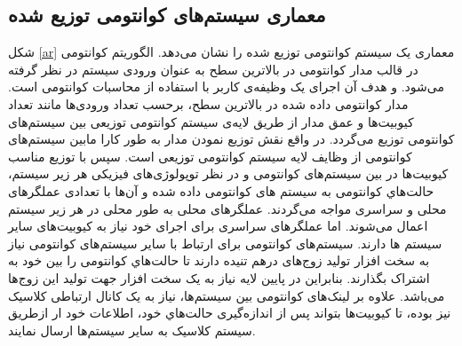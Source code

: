 \subsection{معماری سیستم‌های کوانتومی توزیع شده}
شکل \ref{ar} معماری یک سیستم کوانتومی توزیع شده را نشان می‌دهد. الگوریتم کوانتومی در قالب مدار کوانتومی در بالاترین سطح به عنوان ورودی سیستم در نظر گرفته می‌شود. و هدف آن اجرای یک وظیفه‌ی کاربر با استفاده از محاسبات کوانتومی است. مدار کوانتومی داده شده در بالاترین سطح، برحسب تعداد ورودی‌ها مانند تعداد کیوبیت‌ها و عمق مدار از طریق لایه‌ی سیستم کوانتومی توزیعی بین سیستم‌های کوانتومی توزیع می‌گردد. در واقع نقش توزیع نمودن مدار به طور کارا مابین سیستم‌های کوانتومی از وظایف لایه سیستم کوانتومی توزیعی است. سپس با توزیع مناسب کیوبیت‌ها در بین سیستم‌های کوانتومی و در نظر توپولوژی‌های فیزیکی هر زیر سیستم، حالت‌هاي کوانتومی به سیستم های کوانتومی داده شده و آن‌ها با تعدادی عملگرهای محلی و سراسری مواجه می‌گردند. عملگرهای محلی به طور محلی در هر زیر سیستم اعمال می‌شوند. اما عملگرهای سراسری  برای اجرای خود نیاز به کیوبیت‌های سایر سیستم ها دارند. سیستم‌های کوانتومی برای ارتباط با سایر سیستم‌های کوانتومی نیاز به سخت افزار تولید زوج‌های درهم تنیده دارند \cite{Pablo} تا حالت‌هاي کوانتومی را بین خود به اشتراک بگذارند. بنابراین در پایین لایه نیاز به یک سخت افزار جهت تولید این زوج‌ها می‌باشد. علاوه بر لینک‌های کوانتومی بین سیستم‌ها، نیاز به یک کانال ارتباطی کلاسیک نیز بوده، تا کیوبیت‌ها بتواند پس از اندازه‌گیری حالت‌هاي خود، اطلاعات خود ار ازطریق سیستم کلاسیک به سایر سیستم‌ها ارسال نمایند. 

